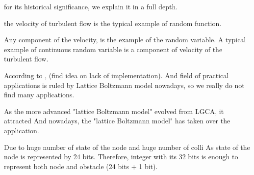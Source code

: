 for its historical significance, we explain it in a full depth.

the velocity of turbulent flow is the typical example of random function.

Any component of the velocity, is the example of the random variable.
A typical example of continuous random variable is a component of velocity of the turbulent flow.

According to \cite{Wolf}, (find idea on lack of implementation).
And field of practical applications is ruled by Lattice Boltzmann model nowadays, so we really do not find many applications.

As the more advanced "lattice Boltzmann model" evolved from LGCA, it attracted 
And nowadays, the "lattice Boltzmann model" has taken over the application.

Due to huge number of state of the node and huge number of colli
As state of the node is represented by 24 bits.
Therefore, integer with its 32 bits is enough to represent both node and obstacle (24 bits + 1 bit).

